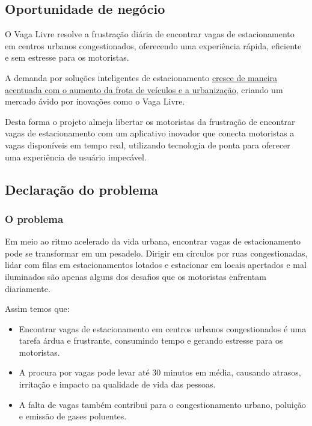 \documentclass[a4paper,12pt]{article}
\begin{document}
\subsection{Oportunidade de negócio}

O Vaga Livre resolve a frustração diária de encontrar vagas de estacionamento em centros urbanos congestionados, oferecendo uma experiência rápida, eficiente e sem estresse para os motoristas.

A demanda por soluções inteligentes de estacionamento \href{https://iot-analytics.com/smart-parking-market-report-2019-2023/}{cresce de maneira acentuada com o aumento da frota de veículos e a urbanização}, criando um mercado ávido por inovações como o Vaga Livre.

Desta forma o projeto almeja libertar os motoristas da frustração de encontrar vagas de estacionamento com um aplicativo inovador que conecta motoristas a vagas disponíveis em tempo real, utilizando tecnologia de ponta para oferecer uma experiência de usuário impecável.

\subsection{Declaração do problema}

\subsubsection{O problema}

Em meio ao ritmo acelerado da vida urbana, encontrar vagas de estacionamento pode se transformar em um pesadelo. Dirigir em círculos por ruas congestionadas, lidar com filas em estacionamentos lotados e estacionar em locais apertados e mal iluminados são apenas alguns dos desafios que os motoristas enfrentam diariamente. 

Assim temos que:

\begin{itemize}
    \item Encontrar vagas de estacionamento em centros urbanos congestionados é uma tarefa árdua e frustrante, consumindo tempo e gerando estresse para os motoristas.
    \item A procura por vagas pode levar até 30 minutos em média, causando atrasos, irritação e impacto na qualidade de vida das pessoas.
    \item A falta de vagas também contribui para o congestionamento urbano, poluição e emissão de gases poluentes.
\end{itemize}
\end{document}
